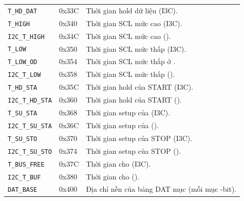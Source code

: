 \begin{longtable}{L{4.6cm} C{2.0cm} L{6.4cm}}
	\texttt{T\_HD\_DAT}      & 0x33C            & Thời gian hold dữ liệu (I3C).                                                                                               \\
	\texttt{T\_HIGH}         & 0x340            & Thời gian SCL mức cao (I3C).                                                                                                \\
	\texttt{I2C\_T\_HIGH}    & 0x34C            & Thời gian SCL mức cao (\iic{}).                                                                                             \\
	\texttt{T\_LOW}          & 0x350            & Thời gian SCL mức thấp (I3C).                                                                                               \\
	\texttt{T\_LOW\_OD}      & 0x354            & Thời gian SCL mức thấp ở \OpenDrain{}.                                                                                      \\
	\texttt{I2C\_T\_LOW}     & 0x358            & Thời gian SCL mức thấp (\iic{}).                                                                                            \\
	\texttt{T\_HD\_STA}      & 0x35C            & Thời gian hold của START (I3C).                                                                                             \\
	\texttt{I2C\_T\_HD\_STA} & 0x360            & Thời gian hold của START (\iic{}).                                                                                          \\
	\texttt{T\_SU\_STA}      & 0x368            & Thời gian setup của \RepeatedSTART{} (I3C).                                                                                 \\
	\texttt{I2C\_T\_SU\_STA} & 0x36C            & Thời gian setup của \RepeatedSTART{} (\iic{}).                                                                              \\
	\texttt{T\_SU\_STO}      & 0x370            & Thời gian setup của STOP (I3C).                                                                                             \\
	\texttt{I2C\_T\_SU\_STO} & 0x374            & Thời gian setup của STOP (\iic{}).                                                                                          \\
	\texttt{T\_BUS\_FREE}    & 0x37C            & Thời gian cho \BusFreeCondition{} (I3C).                                                                                    \\
	\texttt{I2C\_T\_BUF}     & 0x380            & Thời gian cho \BusFreeCondition{} (\iic{}).                                                                                 \\
	\texttt{DAT\_BASE}       & 0x400            & Địa chỉ nền của bảng DAT \DatEntryCount{} mục (mỗi mục \DatEntryWidth{}-bit).                                               \\
	\bottomrule
\end{longtable}

